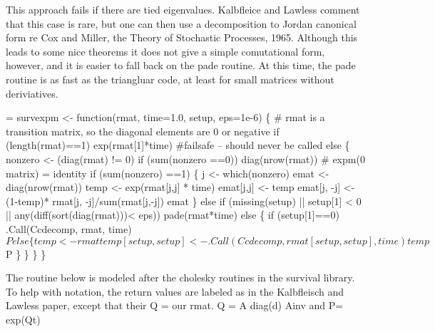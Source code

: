 \documentclass{article}
\begin{document}
This approach fails if there are tied eigenvalues.
Kalbfleice and Lawless comment that this case is rare,
but one can then use a decomposition to Jordan canonical form re
Cox and Miller, the Theory of Stochastic Processes, 1965.
Although this leads to some nice theorems it does not give a 
simple comutational form, however, 
and it is easier to fall back on the pade routine.
At this time, the pade routine is as fast as the triangluar code,
at least for small matrices without deriviatives.

\begin{nwchunk}
=
 survexpm <- function(rmat, time=1.0, setup, eps=1e-6) \{
     # rmat is a transition matrix, so the diagonal elements are 0 or negative
     if (length(rmat)==1) exp(rmat[1]*time)  #failsafe -- should never be called
     else \{
         nonzero <- (diag(rmat) != 0)
         if (sum(nonzero ==0)) diag(nrow(rmat))  # expm(0 matrix) = identity
         if (sum(nonzero) ==1) \{
             j <- which(nonzero)
             emat <- diag(nrow(rmat))
             temp <- exp(rmat[j,j] * time)
             emat[j,j] <- temp
             emat[j, -j] <- (1-temp)* rmat[j, -j]/sum(rmat[j,-j])
             emat
         \}
         else if (missing(setup) || setup[1] < 0 ||
                  any(diff(sort(diag(rmat)))< eps)) pade(rmat*time)
         else \{
             if (setup[1]==0) .Call(Ccdecomp, rmat, time)$P
             else \{
                 temp <- rmat
                 temp[setup, setup] <- .Call(Ccdecomp, rmat[setup, setup], time)
                 temp$P
             \}
         \}
     \}
 \}
\end{nwchunk}

The routine below is modeled after the cholesky routines in the survival
library.  
To help with notation, the return values are labeled as in the 
Kalbfleisch and Lawless paper,
except that their Q = our rmat.  Q = A diag(d) Ainv and P= exp(Qt)
\end{document}
